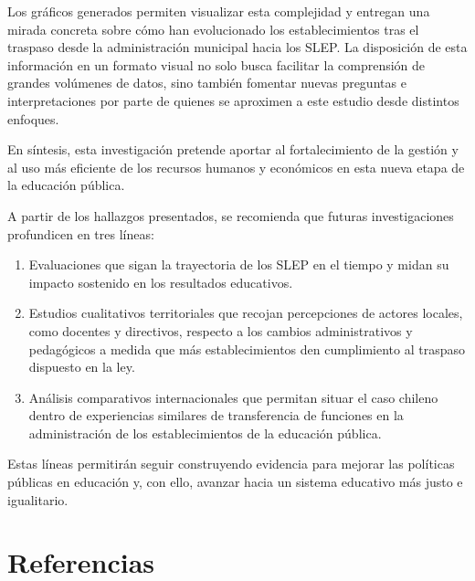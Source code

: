 \documentclass[
  12pt,
  letterpaper,
]{article}
\begin{document}
Los gráficos generados permiten visualizar esta complejidad y entregan una mirada concreta sobre cómo han evolucionado los establecimientos tras el traspaso desde la administración municipal hacia los SLEP.
La disposición de esta información en un formato visual no solo busca facilitar la comprensión de grandes volúmenes de datos, sino también fomentar nuevas preguntas e interpretaciones por parte de quienes se aproximen a este estudio desde distintos enfoques.

En síntesis, esta investigación pretende aportar al fortalecimiento de la gestión y al uso más eficiente de los recursos humanos y económicos en esta nueva etapa de la educación pública.

A partir de los hallazgos presentados, se recomienda que futuras investigaciones profundicen en tres líneas:

\begin{enumerate}
\def\labelenumi{\arabic{enumi}.}
\item
  Evaluaciones que sigan la trayectoria de los SLEP en el tiempo y midan su impacto sostenido en los resultados educativos.
\item
  Estudios cualitativos territoriales que recojan percepciones de actores locales, como docentes y directivos, respecto a los cambios administrativos y pedagógicos a medida que más establecimientos den cumplimiento al traspaso dispuesto en la ley.
\item
  Análisis comparativos internacionales que permitan situar el caso chileno dentro de experiencias similares de transferencia de funciones en la administración de los establecimientos de la educación pública.
\end{enumerate}

Estas líneas permitirán seguir construyendo evidencia para mejorar las políticas públicas en educación y, con ello, avanzar hacia un sistema educativo más justo e igualitario.

\newpage

\section{Referencias}\label{referencias}
\end{document}
